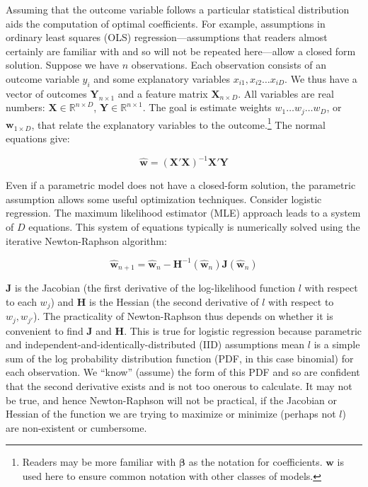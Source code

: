 \documentclass{article}
\begin{document}
Assuming that the outcome variable follows a
particular statistical distribution aids the computation of optimal coefficients. 
For example, assumptions in ordinary least squares (OLS)
regression---assumptions that readers almost certainly are familiar with and so will not be
repeated here---allow a closed form solution. Suppose we have $n$
observations. Each observation consists of an outcome variable $y_i$ and some
explanatory variables $x_{i1}, x_{i2}\ldots x_{iD}$. We thus have a vector of
outcomes $\bm{Y}_{n \times 1}$ and a feature matrix $\bm{X}_{n \times D}$. All
variables are real numbers: $\bm{X} \in \mathbb{R}^{n \times D}$, $\bm{Y} \in
\mathbb{R}^{n \times 1}$. The goal
is estimate weights $w_1 \ldots w_j \ldots w_D$, or $\bm{w}_{1 \times D}$, that relate the explanatory variables
to the outcome.\footnote{Readers may be more familiar with $\bm{\beta}$ as the
notation for coefficients. $\bm{w}$ is used here to ensure common notation with
other classes of models.} The normal equations give:

$$
\hat{\bm{w}} = (\bm{X}'\bm{X})^{-1}\bm{X}'\bm{Y}
$$

Even if a parametric model does not have a closed-form solution, the parametric
assumption allows some useful optimization techniques. Consider logistic
regression. The maximum likelihood estimator (MLE) approach leads to
a system of $D$ equations. This system of
equations typically is numerically solved using the iterative Newton-Raphson
algorithm:

$$
\hat{\bm{w}}_{n+1} = \hat{\bm{w}}_{n} -
\bm{H}^{-1}(\hat{\bm{w}}_n)\bm{J}(\hat{\bm{w}}_n)
$$

$\bm{J}$ is the Jacobian (the
first derivative of the log-likelihood function $l$ with respect to each $w_j$)
and $\bm{H}$ is the Hessian (the second derivative of $l$ with respect to $w_j,
w_{j'}$). The practicality of Newton-Raphson thus depends on whether it is convenient to
find $\bm{J}$ and $\bm{H}$. This is true for logistic regression
because parametric and independent-and-identically-distributed (IID) assumptions
mean $l$ is a simple sum of the log probability distribution
function (PDF, in this case binomial) for each observation. We ``know'' (assume)
the form of this PDF and so are
confident that the second derivative exists and is not too onerous to calculate. It may not be true, and hence
Newton-Raphson will not be practical, if the Jacobian or Hessian of the function we are trying to
maximize or minimize (perhaps not $l$) are non-existent or cumbersome. 
\end{document}
